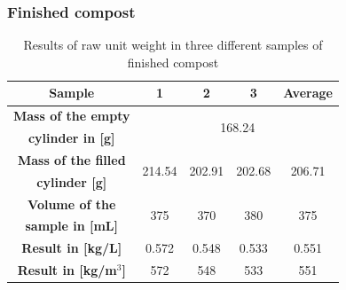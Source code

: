 \documentclass{article}
\begin{document}
\subsubsection{Finished compost}
\renewcommand{\arraystretch}{1.5}
\begin{table}[ht!]
    \centering \vspace{.3cm}
    \caption{Results of raw unit weight in three different samples of finished compost}
    \begin{tabular}{|c|c|c|c|c|}
        \hline
        \textbf{Sample} & \textbf{1} & \textbf{2} & \textbf{3} & \textbf{Average}\\
        \hline
        {\textbf{Mass of the empty}} & \multicolumn{4}{c|}{\multirow{2}{*}{168.24}}\\
        \textbf{cylinder in [g]} & \multicolumn{4}{c|}{}\\
        \hline
        \textbf{Mass of the filled} & \multirow{2}{*}{214.54} & \multirow{2}{*}{202.91} & \multirow{2}{*}{202.68} & \multirow{2}{*}{206.71}\\
        \textbf{cylinder [g]} & & & &\\
        \hline
        \textbf{Volume of the} & \multirow{2}{*}{375} & \multirow{2}{*}{370} & \multirow{2}{*}{380} & \multirow{2}{*}{375}\\
        \textbf{sample in [mL]} & & & &\\
        \hline
        \textbf{Result in [kg/L]} & 0.572 & 0.548 & 0.533 & 0.551\\
        \hline
        \textbf{Result in [kg/m$^3$]} & 572 & 548 & 533 & 551\\
        \hline
    \end{tabular}
\end{table}
\end{document}
